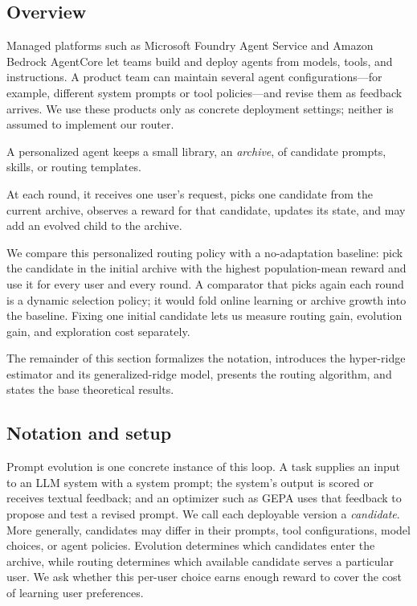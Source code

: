 \documentclass{article} %
\begin{document}
\subsection{Overview}

\label{sec:method-plain}
Managed platforms such as Microsoft Foundry Agent Service and Amazon Bedrock AgentCore \citep{microsoft2026foundryagents,aws2026agentcore} let teams build and deploy agents from models, tools, and instructions. A product team can maintain several agent configurations---for example, different system prompts or tool policies---and revise them as feedback arrives. We use these products only as concrete deployment settings; neither is assumed to implement our router.

A personalized agent keeps a small library, an \emph{archive}, of candidate prompts, skills, or routing templates.

At each round, it receives one user's request, picks one candidate from the current archive, observes a reward for that candidate, updates its state, and may add an evolved child to the archive.

We compare this personalized routing policy with a no-adaptation baseline: pick the candidate in the initial archive with the highest population-mean reward and use it for every user and every round. A comparator that picks again each round is a dynamic selection policy; it would fold online learning or archive growth into the baseline. Fixing one initial candidate lets us measure routing gain, evolution gain, and exploration cost separately.

The remainder of this section formalizes the notation, introduces the hyper-ridge estimator and its generalized-ridge model, presents the routing algorithm, and states the base theoretical results.

\subsection{Notation and setup}

\label{sec:method-notation}
Prompt evolution is one concrete instance of this loop. A task supplies an input to an LLM system with a system prompt; the system's output is scored or receives textual feedback; and an optimizer such as GEPA \citep{agrawal2025geparp} uses that feedback to propose and test a revised prompt. We call each deployable version a \emph{candidate}. More generally, candidates may differ in their prompts, tool configurations, model choices, or agent policies. Evolution determines which candidates enter the archive, while routing determines which available candidate serves a particular user. We ask whether this per-user choice earns enough reward to cover the cost of learning user preferences.
\end{document}
